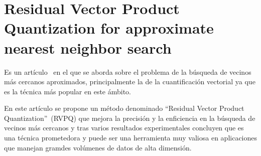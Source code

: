 
\section{Residual Vector Product Quantization for approximate nearest neighbor search}

Es un artículo~\cite{elsevier:vectorquantiaztion} en el que se aborda sobre el problema de la búsqueda de vecinos más cercanos aproximados, principalmente la de la cuantificación vectorial ya que es la técnica más popular en este ámbito.

En este artículo se propone un método denominado ``Residual Vector Product Quantization''~(RVPQ) que mejora la precisión y la enficiencia en la búsqueda de vecinos más cercanos y tras varios resultados experimentales concluyen que es una técnica prometedora y puede ser una herramienta muy valiosa en aplicaciones que manejan gramdes volúmenes de datos de alta dimensión.